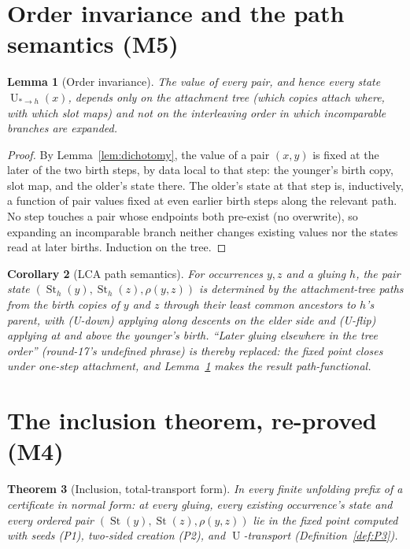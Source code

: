 \documentclass[11pt]{article}
\newtheorem{theorem}{Theorem}[section]
\newtheorem{lemma}[theorem]{Lemma}
\newtheorem{corollary}[theorem]{Corollary}
\theoremstyle{definition}
\newcommand{\St}{\operatorname{St}}
\newcommand{\U}{\operatorname{U}}
\begin{document}
\section{Order invariance and the path semantics (M5)}\label{sec:order}

\begin{lemma}[Order invariance]\label{lem:order}
The value of every pair, and hence every state $\U_{\!*\to h}(x)$,
depends only on the attachment \emph{tree} (which copies attach where,
with which slot maps) and not on the interleaving order in which
incomparable branches are expanded.
\end{lemma}

\begin{proof}
By Lemma~\ref{lem:dichotomy}, the value of a pair $(x,y)$ is fixed at
the later of the two birth steps, by data local to that step: the
younger's birth copy, slot map, and the older's state there.  The
older's state at that step is, inductively, a function of pair values
fixed at even earlier birth steps along the relevant path.  No step
touches a pair whose endpoints both pre-exist (no overwrite), so
expanding an incomparable branch neither changes existing values nor
the states read at later births.  Induction on the tree.
\end{proof}

\begin{corollary}[LCA path semantics]\label{cor:lca}
For occurrences $y,z$ and a gluing $h$, the pair state
$(\St_h(y),\St_h(z),\rho(y,z))$ is determined by the attachment-tree
paths from the birth copies of $y$ and $z$ through their least common
ancestors to $h$'s parent, with (U-down) applying along descents on the
elder side and (U-flip) applying at and above the younger's birth.
``Later gluing elsewhere in the tree order'' (round-17's undefined
phrase) is thereby replaced: the fixed point closes under one-step
attachment, and Lemma~\ref{lem:order} makes the result path-functional.
\end{corollary}

\section{The inclusion theorem, re-proved (M4)}\label{sec:incl}

\begin{theorem}[Inclusion, total-transport form]\label{thm:incl}
In every finite unfolding prefix of a certificate in normal form: at
every gluing, every existing occurrence's state and every ordered pair
$(\St(y),\St(z),\rho(y,z))$ lie in the fixed point computed with seeds
(P1), two-sided creation (P2), and $\U$-transport
(Definition~\ref{def:P3}).
\end{theorem}
\end{document}
